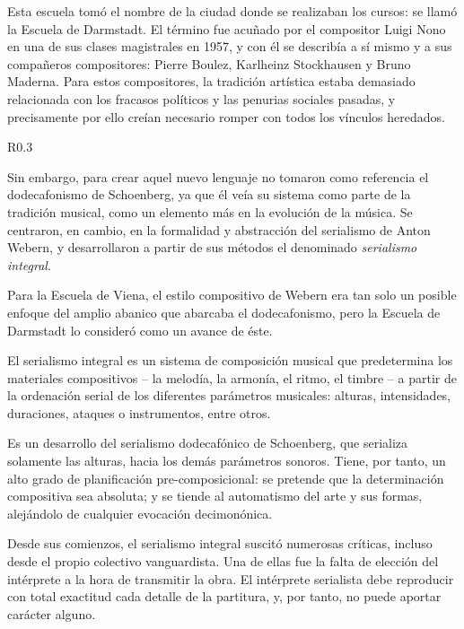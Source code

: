 	Esta escuela tomó el nombre de la ciudad donde se realizaban los cursos: se llamó la Escuela de Darmstadt. El término fue acuñado por el compositor Luigi Nono en una de sus clases magistrales en 1957, y con él se describía a sí mismo y a sus compañeros compositores: Pierre Boulez, Karlheinz Stockhausen y Bruno Maderna. Para estos compositores, la tradición artística estaba demasiado relacionada con los fracasos políticos y las penurias sociales pasadas, y precisamente por ello creían necesario romper con todos los vínculos heredados.
	
	\pagebreak
	
	\begin{wrapfigure}{R}{0.3\textwidth}
		\captionsetup{justification=centering, font=footnotesize}
	\end{wrapfigure}
    Sin embargo, para crear aquel nuevo lenguaje no tomaron como referencia el dodecafonismo de Schoenberg, ya que él veía su sistema como parte de la tradición musical, como un elemento más en la evolución de la música. Se centraron, en cambio, en la formalidad y abstracción del serialismo de Anton Webern, y desarrollaron a partir de sus métodos el denominado \emph{serialismo integral}.
    
    Para la Escuela de Viena, el estilo compositivo de Webern era tan solo un posible enfoque del amplio abanico que abarcaba el dodecafonismo, pero la Escuela de Darmstadt lo consideró como un avance de éste.
	
	El serialismo integral es un sistema de composición musical que predetermina los materiales compositivos -- la melodía, la armonía, el ritmo, el timbre -- a partir de la ordenación serial de los diferentes parámetros musicales: alturas, intensidades, duraciones, ataques o instrumentos, entre otros. 
	
	Es un desarrollo del serialismo dodecafónico de Schoenberg, que serializa solamente las alturas, hacia los demás parámetros sonoros. Tiene, por tanto, un alto grado de planificación pre-composicional: se pretende que la determinación compositiva sea absoluta; y se tiende al automatismo del arte y sus formas, alejándolo de cualquier evocación decimonónica.

	Desde sus comienzos, el serialismo integral suscitó numerosas críticas, incluso desde el propio colectivo vanguardista. Una de ellas fue la falta de elección del intérprete a la hora de transmitir la obra. El intérprete serialista debe reproducir con total exactitud cada detalle de la partitura, y, por tanto, no puede aportar carácter alguno. 
	
